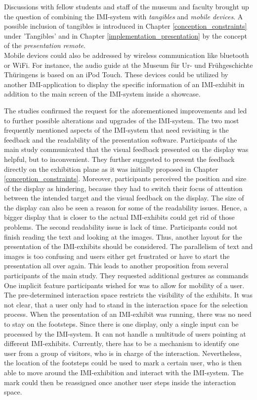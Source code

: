 Discussions with fellow students and staff of the museum and faculty brought up the question of combining the \ac{IMI}-system with \textit{tangibles} and \textit{mobile devices}. A possible inclusion of tangibles is introduced in Chapter \ref{conception_constraints} under 'Tangibles' and in Chapter \ref{implementation_presentation} by the concept of the \textit{presentation remote}.
\\
Mobile devices could also be addressed by wireless communication like bluetooth or WiFi. For instance, the audio guide at the Museum für Ur- und Frühgeschichte Thüringens is based on an iPod Touch. These devices could be utilized by another \ac{IMI}-application to display the specific information of an \ac{IMI}-exhibit in addition to the main screen of the \ac{IMI}-system inside a showcase.

The studies confirmed the request for the aforementioned improvements and led to further possible alterations and upgrades of the \ac{IMI}-system. The two most frequently mentioned aspects of the \ac{IMI}-system that need revisiting is the feedback and the readability of the presentation software. Participants of the main study communicated that the visual feedback presented on the display was helpful, but to inconvenient. They further suggested to present the feedback directly on the exhibition plane as it was initially proposed in Chapter \ref{conception_constraints}. Moreover, participants perceived the position and size of the display as hindering, because they had to switch their focus of attention between the intended target and the visual feedback on the display. The size of the display can also be seen a reason for some of the readability issues. Hence, a bigger display that is closer to the actual \ac{IMI}-exhibits could get rid of those problems. The second readability issue is lack of time. Participants could not finish reading the text and looking at the images. Thus, another layout for the presentation of the \ac{IMI}-exhibits should be considered. The parallelism of text and images is too confusing and users either get frustrated or have to start the presentation all over again. This leads to another proposition from several participants of the main study. They requested additional gestures as commands
\\
One implicit feature participants wished for was to allow for mobility of a user. The pre-determined interaction space restricts the visibility of the exhibits. It was not clear, that a user only had to stand in the interaction space for the selection process. When the presentation of an \ac{IMI}-exhibit was running, there was no need to stay on the footsteps. Since there is one display, only a single input can be processed by the \ac{IMI}-system. It can not handle a multitude of users pointing at different \ac{IMI}-exhibits. Currently, there has to be a mechanism to identify one user from a group of visitors, who is in charge of the interaction. Nevertheless, the location of the footsteps could be used to mark a certain user, who is then able to move around the \ac{IMI}-exhibition and interact with the \ac{IMI}-system. The mark could then be reassigned once another user steps inside the interaction space.

